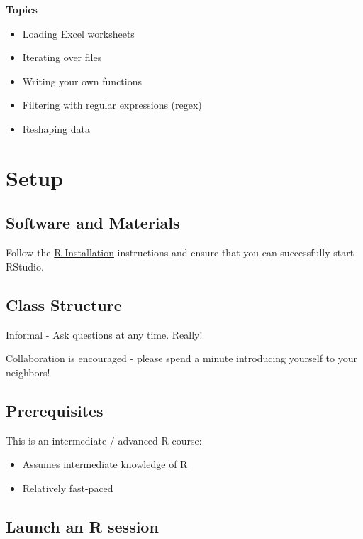 \documentclass[
]{book}
\providecommand{\tightlist}{%
  \setlength{\itemsep}{0pt}\setlength{\parskip}{0pt}}
\begin{document}
\textbf{Topics}

\begin{itemize}
\tightlist
\item
  Loading Excel worksheets
\item
  Iterating over files
\item
  Writing your own functions
\item
  Filtering with regular expressions (regex)
\item
  Reshaping data
\end{itemize}

\hypertarget{setup-3}{%
\section{Setup}\label{setup-3}}

\hypertarget{software-and-materials-3}{%
\subsection{Software and Materials}\label{software-and-materials-3}}

Follow the \href{./Rinstall.html}{R Installation} instructions and ensure that you can successfully start RStudio.

\hypertarget{class-structure-3}{%
\subsection{Class Structure}\label{class-structure-3}}

Informal - Ask questions at any time. Really!

Collaboration is encouraged - please spend a minute introducing yourself to your neighbors!

\hypertarget{prerequisites-3}{%
\subsection{Prerequisites}\label{prerequisites-3}}

This is an intermediate / advanced R course:

\begin{itemize}
\tightlist
\item
  Assumes intermediate knowledge of R
\item
  Relatively fast-paced
\end{itemize}

\hypertarget{launch-an-r-session-2}{%
\subsection{Launch an R session}\label{launch-an-r-session-2}}
\end{document}
